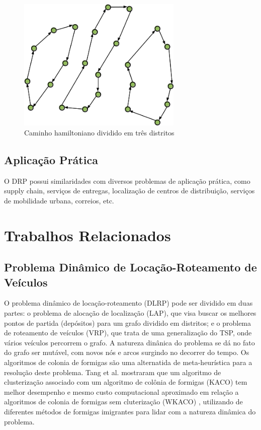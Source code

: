 \documentclass[12pt]{elsarticle}
\begin{document}
\begin{figure}[H]
\centering
\includegraphics[width=0.7\textwidth]{grafo-distrito3.png}
\vspace{0.5cm}
\caption{\label{fig:proporcionalreaposta}Caminho hamiltoniano dividido em três distritos}
\end{figure}
    
    
    \subsection{Aplicação Prática}
    
    O DRP possui similaridades com diversos problemas de aplicação prática, como supply chain, serviços de entregas, localização de centros de distribuição, serviços de mobilidade urbana, correios, etc. \cite{groer} \cite{wang}
    
	
	\section{Trabalhos Relacionados} \label{trabalhosRelacionados}
	
	\subsection{Problema Dinâmico de Locação-Roteamento de Veículos} \label{locationRouting}
    O problema dinâmico de locação-roteamento (DLRP) pode ser dividido em duas partes: o problema de alocação de localização (LAP), que visa buscar os melhores pontos de partida (depósitos) para um grafo dividido em distritos; e o problema de roteamento de veículos (VRP), que trata de uma generalização do TSP, onde vários veículos percorrem o grafo. A natureza dinânica do problema se dá no fato do grafo ser mutável, com novos nós e arcos surgindo no decorrer do tempo. Os algoritmos de colonia de formigas são uma alternatida de meta-heurística para a resolução deste problema. Tang et al. mostraram que um algoritmo de clusterização associado com um algoritmo de colônia de formigas (KACO) tem melhor desempenho e mesmo custo computacional aproximado em relação a algoritmos de colonia de formigas sem cluterização (WKACO) \cite{tang}, utilizando de diferentes métodos de formigas imigrantes para lidar com a natureza dinâmica do problema.
	
\end{document}

